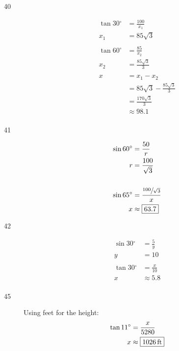 \documentclass{exam}
\newcommand{\dg}{\ensuremath{^\circ}}
\begin{document}
\begin{description}
      \item[40]
        \begin{align*}
          \tan 30 \dg & = \frac{100}{x_1} \\
          x_1         & = 85 \sqrt{3} \\
          \\
          \tan 60 \dg & = \frac{85}{x_2} \\
          x_2         & = \frac{85 \sqrt{3}}{3} \\
          \\
          x  & = x_1 - x_2 \\
             & = 85 \sqrt{3} - \frac{85 \sqrt{3}}{3} \\
             & = \frac{170 \sqrt{3}}{3} \\
             & \approx \boxed{ 98.1 } \\
        \end{align*}

      \item[41]
        \begin{align*}
          \sin 60 \dg & = \frac{50}{r} \\
          r           & = \frac{100}{\sqrt{3}} \\
          \\
          \sin 65 \dg & = \frac{ \sfrac{100}{\sqrt{3}} }{x} \\
          x          & \approx \boxed{ 63.7 } \\
        \end{align*}

      \item[42]
        \begin{align*}
          \sin 30 \dg & = \frac{5}{y} \\
          y           & = 10 \\
          \\
          \tan 30 \dg & = \frac{x}{10} \\
          x          & \approx \boxed{ 5.8 } \\
        \end{align*}

      \item[45]
        Using feet for the height:
        \begin{align*}
          \tan 11 \dg & = \frac{x}{5280} \\
          x           & \approx \boxed{ \unit[1026]{ft} } \\
        \end{align*}


\end{description}
\end{document}
